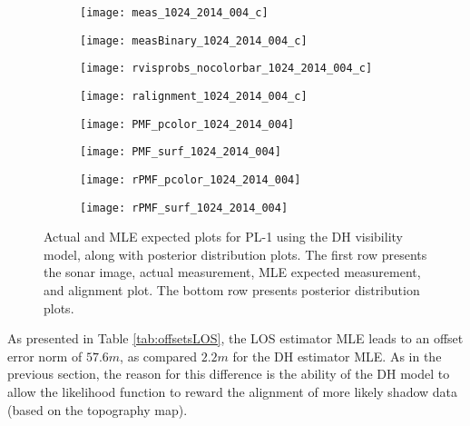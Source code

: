 \begin{figure} [h!]
	\centering
	\begin{subfigure}[b]{0.24\textwidth}
                \texttt{[image: meas\_1024\_2014\_004\_c]}
                \caption{}
	\end{subfigure}
  	\centering
	\begin{subfigure}[b]{0.24\textwidth}
                \texttt{[image: measBinary\_1024\_2014\_004\_c]}
		\caption{}
  	\end{subfigure}
  	\centering
	\begin{subfigure}[b]{0.24\textwidth}
                \texttt{[image: rvisprobs\_nocolorbar\_1024\_2014\_004\_c]}
		\caption{}
  	\end{subfigure}
  	\centering
	\begin{subfigure}[b]{0.24\textwidth}
                \texttt{[image: ralignment\_1024\_2014\_004\_c]}
		\caption{}
  	\end{subfigure}

	\centering
	\begin{subfigure}[b]{0.24\textwidth}
                \texttt{[image: PMF\_pcolor\_1024\_2014\_004]}
		\caption{}
  	\end{subfigure}
  	\centering
	\begin{subfigure}[b]{0.24\textwidth}
                \texttt{[image: PMF\_surf\_1024\_2014\_004]}
		\caption{}
  	\end{subfigure} 	
  	\begin{subfigure}[b]{0.24\textwidth}
                \texttt{[image: rPMF\_pcolor\_1024\_2014\_004]}
		\caption{}
  	\end{subfigure}
  	\centering
	\begin{subfigure}[b]{0.24\textwidth}
                \texttt{[image: rPMF\_surf\_1024\_2014\_004]}
		\caption{}
  	\end{subfigure}
  	
	\caption{Actual and MLE expected plots for PL-1 using the DH visibility model, along with posterior distribution plots. The first row presents the sonar image, actual measurement, MLE expected measurement, and alignment plot. The bottom row presents posterior distribution plots.}
	\label{fig:pl1}
\end{figure}

As presented in Table \ref{tab:offsetsLOS}, the LOS estimator MLE leads to an offset error norm of $57.6m$, as compared $2.2m$ for the DH estimator MLE.
As in the previous section, the reason for this difference is the ability of the DH model to allow the likelihood function to reward the alignment of more likely shadow data (based on the topography map).

